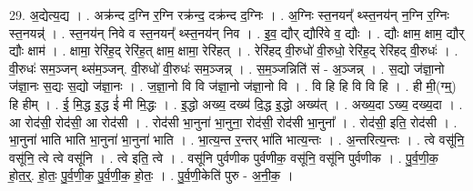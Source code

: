 \documentclass[17pt]{extarticle}
\begin{document}
29. अ॒द्येत्य॒द्य । . अक्र॑न्द द॒ग्नि र॒ग्नि रक्र॑न्द॒ दक्र॑न्द द॒ग्निः । . अ॒ग्निः स्त॒नयन्᳚ थ्स्त॒नय॑न् न॒ग्नि र॒ग्निः स्त॒नयन्न्॑ । . स्त॒नय॑न् निवे व स्त॒नयन्᳚ थ्स्त॒नय॑न् निव । . इ॒व॒ द्यौर् द्यौरि॑वे व॒ द्यौः । . द्यौः क्षाम॒ क्षाम॒ द्यौर् द्यौः क्षाम॑ । . क्षामा॒ रेरि॑ह॒द् रेरि॑ह॒त् क्षाम॒ क्षामा॒ रेरि॑हत् । . रेरि॑हद् वी॒रुधो॑ वी॒रुधो॒ रेरि॑ह॒द् रेरि॑हद् वी॒रुधः॑ । . वी॒रुधः॑ सम॒ञ्जन् थ्स॑म॒ञ्जन्. वी॒रुधो॑ वी॒रुधः॑ सम॒ञ्जन्न् । . स॒म॒ञ्जन्निति॑ सं - अ॒ञ्जन्न् । . स॒द्यो ज॑ज्ञा॒नो ज॑ज्ञा॒नः स॒द्यः स॒द्यो ज॑ज्ञा॒नः । . ज॒ज्ञा॒नो वि वि ज॑ज्ञा॒नो ज॑ज्ञा॒नो वि । . वि हि हि वि वि हि । . ही मी॒(ग्म्॒) हि हीम् । . ई॒ मि॒द्ध इ॒द्ध ई॑ मी मि॒द्धः । . इ॒द्धो अख्य॒ दख्य॑ दि॒द्ध इ॒द्धो अख्य॑त् । . अख्य॒दा ऽख्य॒ दख्य॒दा । . आ रोद॑सी॒ रोद॑सी॒ आ रोद॑सी । . रोद॑सी भा॒नुना॑ भा॒नुना॒ रोद॑सी॒ रोद॑सी भा॒नुना᳚ । . रोद॑सी॒ इति॒ रोद॑सी । . भा॒नुना॑ भाति भाति भा॒नुना॑ भा॒नुना॑ भाति । . भा॒त्य॒न्त र॒न्तर् भा॑ति भात्य॒न्तः । . अ॒न्तरित्य॒न्तः । . त्वे वसू॑नि॒ वसू॑नि॒ त्वे त्वे वसू॑नि । . त्वे इति॒ त्वे । . वसू॑नि पुर्वणीक पुर्वणीक॒ वसू॑नि॒ वसू॑नि पुर्वणीक । . पु॒र्व॒णी॒क॒ हो॒त॒र्॒. हो॒तः॒ पु॒र्व॒णी॒क॒ पु॒र्व॒णी॒क॒ हो॒तः॒ । . पु॒र्व॒णी॒केति॑ पुरु - अ॒नी॒क॒ । \newline
\end{document}
